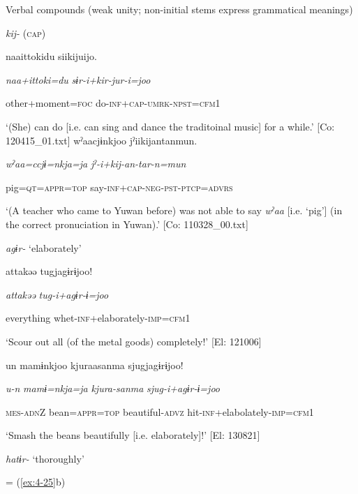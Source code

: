 \ea\label{ex:8-148}
  Verbal compounds (weak unity; non-initial stems express grammatical meanings)

  \textit{kij-} (\textsc{cap})

\ea {\TM}
\glll  naa{\textbar}ittoki{\textbar}du  siikijuijo.

      \textit{naa+ittoki=du}  \textit{sɨr-i+kir{}-jur-i=joo}

      other+moment=\textsc{foc}  do-\textsc{inf}+\textsc{cap}-\textsc{umrk}-\textsc{npst}=\textsc{cfm1}

\glt ‘(She) can do [i.e. can sing and dance the traditoinal music] for a while.’ [Co: 120415\_01.txt]
\ex {\TM}
\glll  wˀaacjɨnkjoo  jˀiikijantanmun.

      \textit{wˀaa=ccjɨ=nkja=ja}  \textit{jˀ-i+kij{}-an-tar-n=mun}

      pig=\textsc{qt}=\textsc{appr}=\textsc{top}  say-\textsc{inf}+\textsc{cap}-\textsc{neg}-\textsc{pst}-\textsc{ptcp}=\textsc{advrs}

\glt ‘(A teacher who came to Yuwan before) was not able to say \textit{wˀaa} [i.e. ‘pig’] (in the correct pronuciation in Yuwan).’ [Co: 110328\_00.txt]
\z

  \textit{agɨr-} ‘elaborately’


    {\TM}
\glll  attakəə  tugjagɨrɨjoo!

      \textit{attakəə}  \textit{tug-i+agɨr{}-ɨ=joo}

      everything  whet-\textsc{inf}+elaborately-\textsc{imp}=\textsc{cfm1}

\glt ‘Scour out all (of the metal goods) completely!’ [El: 121006]

\ex {\TM}
\glll  un  mamɨnkjoo  kjuraasanma  sjugjagɨrɨjoo!

      \textit{u-n}  \textit{mamɨ=nkja=ja}  \textit{kjura-sanma}  \textit{sjug-i+agɨr{}-ɨ=joo}

      \textsc{mes}-\textsc{adn}Z  bean=\textsc{appr}=\textsc{top}  beautiful{}-\textsc{advz}  hit{}-\textsc{inf}+elabolately{}-\textsc{imp}=\textsc{cfm1}

\glt ‘Smash the beans beautifully [i.e. elaborately]!’ [El: 130821]

  \textit{hatɨr-} ‘thoroughly’

 = (\ref{ex:4-25}b)

